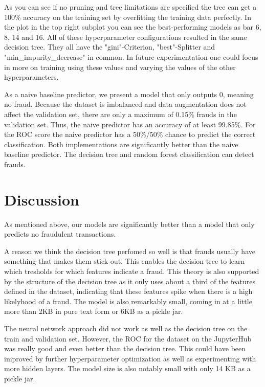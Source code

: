 \documentclass[a4paper, 10pt, conference]{ieeeconf}      %
\begin{document}
As you can see if no pruning and tree limitations are specified the tree can get a 100\% accuracy on the training set by overfitting the training data perfectly.
In the plot in the top right subplot you can see the best-performing models as bar 6, 8, 14 and 16. All of these hyperparameter configurations resulted in the same decision tree. 
They all have the "gini"-Criterion, "best"-Splitter and "min\_impurity\_decrease" in common. 
In future experimentation one could focus in more on training using these values and varying the values of the other hyperparameters.

As a naive baseline predictor, we present a model that only outputs 0, meaning no fraud. 
Because the dataset is imbalanced and data augmentation does not affect the validation set, there are only a maximum of 0.15\% frauds in the validation set. 
Thus, the naive predictor has an accuracy of at least 99.85\%. For the ROC score the naive predictor has a 50\%/50\% chance to predict the correct classification.
Both implementations are significantly better than the naive baseline predictor. The decision tree and random forest classification can detect frauds.

\section{Discussion}
\label{sec:discuss}
As mentioned above, our models are significantly better than a model that only predicts no fraudulent transactions.

A reason we think the decision tree perfomed so well is that frauds usually have something that makes them stick out. 
This enables the decision tree to learn which tresholds for which features indicate a fraud. 
This theory is also supported by the structure of the decision tree as it only uses about a third of the features defined in the dataset, indicating that these features spike when there is a high likelyhood of a fraud.
The model is also remarkably small, coming in at a little more than 2KB in pure text form or 6KB as a pickle jar.

The neural network approach did not work as well as the decision tree on the train and validation set. However, the ROC for the dataset on the JupyterHub was really good and even better than the decision tree.
 This could have been improved by further hyperparameter optimization as well as experimenting with more hidden layers. The model size is also notably small with only 14 KB as a pickle jar. 
\end{document}
